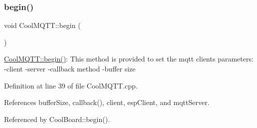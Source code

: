 \subsubsection{\texorpdfstring{begin()}{begin()}}
{\footnotesize\ttfamily void Cool\+M\+Q\+T\+T\+::begin (\begin{DoxyParamCaption}{ }\end{DoxyParamCaption})}

\hyperlink{classCoolMQTT_ac9248808641ebf3054ed0620ea9d0100}{Cool\+M\+Q\+T\+T\+::begin()}\+: This method is provided to set the mqtt client\textquotesingle{}s parameters\+: -\/client -\/server -\/callback method -\/buffer size 

Definition at line 39 of file Cool\+M\+Q\+T\+T.\+cpp.



References buffer\+Size, callback(), client, esp\+Client, and mqtt\+Server.



Referenced by Cool\+Board\+::begin().


